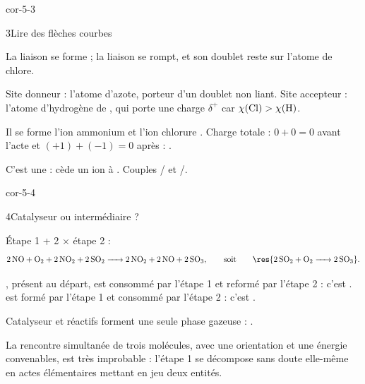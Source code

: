 \begin{blocLivre}{cor-5-3}
\begin{corrige}{3}{Lire des flèches courbes}
\begin{questions}
\item La liaison  se forme ; la liaison  se rompt, et son doublet reste sur l'atome de chlore.
\item Site donneur : l'atome d'azote, porteur d'un doublet non liant. Site accepteur : l'atome d'hydrogène de
, qui porte une charge $\delta^+$ car $\chi(\ce{Cl})>\chi(\ce{H})$.
\item Il se forme l'ion ammonium  et l'ion chlorure . Charge totale : $0+0=0$ avant l'acte et
$(+1)+(-1)=0$ après : .
\item C'est une  :  cède un ion  à . Couples / et
/.
\end{questions}
\end{corrige}
\end{blocLivre}
\begin{blocLivre}{cor-5-4}
\begin{corrige}{4}{Catalyseur ou intermédiaire ?}
\begin{questions}
\item Étape 1 + 2 $\times$ étape 2 :
\[\ce{2 NO + O2 + 2 NO2 + 2 SO2 -> 2 NO2 + 2 NO + 2 SO3},\qquad\text{soit}\qquad\res{\ce{2 SO2 + O2 -> 2 SO3}}.\]
\item {}, présent au départ, est consommé par l'étape 1 et reformé par l'étape 2 : c'est .
 est formé par l'étape 1 et consommé par l'étape 2 : c'est .
\item Catalyseur et réactifs forment une seule phase gazeuse : .
\item La rencontre simultanée de trois molécules, avec une orientation et une énergie convenables, est très
improbable : l'étape 1 se décompose sans doute elle-même en actes élémentaires mettant en jeu deux entités.
\end{questions}
\end{corrige}
\end{blocLivre}
